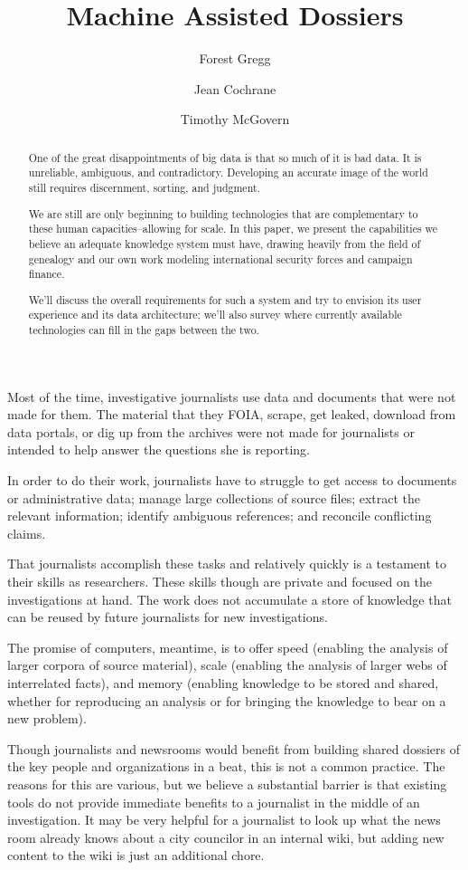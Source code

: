 \documentclass[format=siggraph, review=true]{acmart}
\title{Machine Assisted Dossiers}
\author{Forest Gregg}
\affiliation{DataMade}
\author{Jean Cochrane}
\affiliation{DataMade}
\author{Timothy McGovern}
\affiliation{O'Reilly Media}
\begin{document}
\begin{abstract}One of the great disappointments of big data is that so much
  of it is bad data. It is unreliable, ambiguous, and
  contradictory. Developing an accurate image of the world still
  requires discernment, sorting, and judgment.

  We are still are only beginning to building technologies that are
  complementary to these human capacities--allowing for
  scale.  In this paper, we present the capabilities we believe an
  adequate knowledge system must have, drawing heavily from the field
  of genealogy and our own work modeling international security forces
  and campaign finance.

  We'll discuss the overall requirements for such a system and try to envision its user experience and its data architecture; we'll also survey where currently available technologies can fill in the gaps between the two. 
\end{abstract}

\maketitle

Most of the time, investigative journalists use data and documents
that were not made for them. The material that they FOIA, scrape, get
leaked, download from data portals, or dig up from the archives
were not made for journalists or intended to help answer the
questions she is reporting.

In order to do their work, journalists have to struggle to get access
to documents or administrative data; manage large collections of
source files; extract the relevant information; identify ambiguous
references; and reconcile conflicting claims.

That journalists accomplish these tasks and relatively quickly is a
testament to their skills as researchers. These skills though are
private and focused on the investigations at hand. The work does not
accumulate a store of knowledge that can be reused by future
journalists for new investigations.

The promise of computers, meantime, is to offer speed (enabling the analysis of larger corpora of source material), scale (enabling the analysis of larger webs of interrelated facts), and memory (enabling knowledge to be stored and shared, whether for reproducing an analysis or for bringing the knowledge to bear on a new problem). 

Though journalists and newsrooms would benefit from building shared
dossiers of the key people and organizations in a beat, this is not a
common practice. The reasons for this are various, but we believe a
substantial barrier is that existing tools do not provide immediate
benefits to a journalist in the middle of an investigation. It may be
very helpful for a journalist to look up what the news room already
knows about a city councilor in an internal wiki, but adding new
content to the wiki is just an additional chore. 
\end{document}
